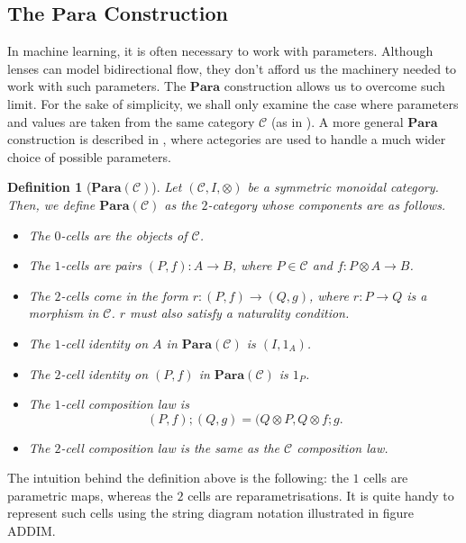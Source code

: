 \documentclass[11pt,a4paper,openright,twoside]{report}
\theoremstyle{plain}
\newtheorem{definition}[proposition]{Definition}
\theoremstyle{definition}
\begin{document}
\subsection{The $\mathbf{Para}$ Construction}\label{subsec: para}


In machine learning, it is often necessary to work with parameters. Although lenses can model bidirectional flow, they don't afford us the machinery needed to work with such parameters. The $\mathbf{Para}$ construction allows us to overcome such limit. For the sake of simplicity, we shall only examine the case where parameters and values are taken from the same category $\mathcal{C}$ (as in \cite{cruttwellDeepLearningParametric}). A more general $\mathbf{Para}$ construction is described in \cite{shieblerCategoryTheoryMachine2021}, where actegories are used to handle a much wider choice of possible parameters.

\begin{definition}[$\mathbf{Para}(\mathcal{C})$]
  Let $(\mathcal{C},I,\otimes)$ be a symmetric monoidal category. Then, we define $\mathbf{Para}(\mathcal{C})$ as the $2$-category whose components are as follows.
  \begin{itemize}
    \item The $0$-cells are the objects of $\mathcal{C}$.
    \item The $1$-cells are pairs $(P,f): A \to B$, where $P \in \mathcal{C}$ and $f: P \otimes A \to B$.
    \item The $2$-cells come in the form $r: (P,f) \to (Q,g)$, where $r: P \to Q$ is a morphism in $\mathcal{C}$. $r$ must also satisfy a naturality condition.
    \item The $1$-cell identity on $A$ in $\mathbf{Para}(\mathcal{C})$ is $(I,1_A)$.
    \item The $2$-cell identity on $(P,f)$ in $\mathbf{Para}(\mathcal{C})$ is $1_P$.
    \item The $1$-cell composition law is
      \[(P,f) ; (Q,g) = (Q \otimes P, Q \otimes f ; g.\]
    \item The $2$-cell composition law is the same as the $\mathcal{C}$ composition law.
  \end{itemize}
    
\end{definition}

The intuition behind the definition above is the following: the $1$ cells are parametric maps, whereas the $2$ cells are reparametrisations.
It is quite handy to represent such cells using the string diagram notation illustrated in figure ADDIM.
\end{document}
